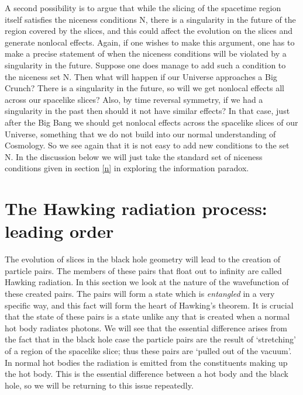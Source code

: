 \documentclass[12pt]{article}
\begin{document}
A second possibility is to argue that while the slicing of the spacetime region itself satisfies the niceness conditions N, there is a singularity in the future of the region covered by the slices, and this could affect the evolution on the slices and generate nonlocal effects. Again, if one wishes to make this argument, one has to make a precise statement of when the niceness conditions will be violated by a singularity in the future. Suppose one does manage to add such a condition to the niceness set N. Then what will happen if our Universe approaches a Big Crunch? There is a singularity in the future, so will we get nonlocal effects all across our spacelike slices? Also, by time reversal symmetry, if we had a singularity in the past then should it not have similar effects? In that case, just after the Big Bang we should get nonlocal effects across the spacelike slices of our Universe, something that we do not build into our normal understanding of Cosmology. So we see again that it is not easy to add new conditions to the set N. In the discussion below we will  just take the standard set of niceness conditions given in section \ref{n} in exploring the information paradox.


\section{The Hawking radiation process: leading order}\label{haw}

The evolution of slices in the black hole geometry will lead to the creation of particle pairs. The members of these pairs that float out to infinity are called Hawking radiation. In this section we look at the nature of the wavefunction of these created pairs. The pairs will form a state which is {\it entangled} in a very specific way, and this fact will form the heart of Hawking's theorem. It is crucial that the state of these pairs is a state unlike any that is created when a normal hot body radiates photons. We will see that the essential difference arises from the fact that in the black hole case the particle pairs are the result of `stretching' of a region of the spacelike slice; thus these pairs are `pulled out of the vacuum'. In normal hot bodies the radiation is emitted from the constituents making up the hot body. This is the essential difference between a hot body and the black hole, so we will be returning to this issue repeatedly.
\end{document}
